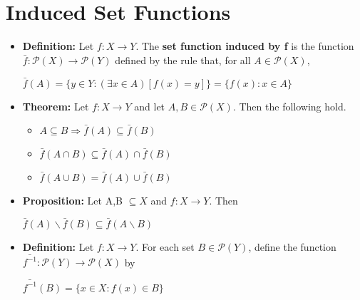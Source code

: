 \documentclass{report}
\begin{document}
	\section{Induced Set Functions}
		\begin{itemize}\addtolength{\leftskip}{2em}
			\item \textbf{Definition:} Let $f:X\rightarrow Y$. The \textbf{set function induced by f} is the function $\bar{f}:\mathcal{P}(X)\rightarrow \mathcal{P}(Y)$ defined by the rule that, for all $A\in\mathcal{P}(X)$,
			\begin{center}
			\Large$\bar{f}(A)=\{ y\in Y:(\exists x\in A)[f(x)=y] \}=\{ f(x):x\in A \}$
			\end{center}
			\item \textbf{Theorem:} Let $f:X\rightarrow Y$ and let $A,B\in\mathcal{P}(X)$. Then the following hold.
			\begin{itemize}\addtolength{\leftskip}{2em}
				\item $A\subseteq B \Rightarrow \bar{f}(A)\subseteq\bar{f}(B)$
				\item $\bar{f}(A\cap B)\subseteq \bar{f}(A)\cap\bar{f}(B)$
				\item $\bar{f}(A\cup B)=\bar{f}(A)\cup \bar{f}(B)$
			\end{itemize}
			\item \textbf{Proposition:} Let A,B $\subseteq X$ and $f:X\rightarrow Y$. Then
			\begin{center}
				$\bar{f}(A)\backslash \bar{f}(B)\subseteq \bar{f}(A\backslash B)$
			\end{center}
			\item \textbf{Definition:} Let $f:X\rightarrow Y$. For each set $B\in \mathcal{P}(Y)$, define the function $\bar{f^{-1}}:\mathcal{P}(Y)\rightarrow \mathcal{P}(X)$ by
			\begin{center}
				$\bar{f^{-1}}(B)=\{ x\in X:f(x)\in B \}$
			\end{center}
		\end{itemize}
\end{document}

